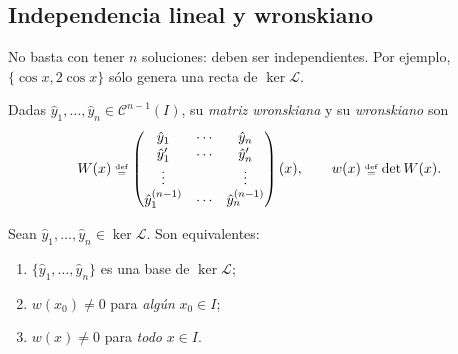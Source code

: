 \documentclass[11pt,twoside]{article}
\newcommand\Lop{\mathcal L}
\newcommand\yh{\hat y}
\newcommand\Cl{\mathcal C}
\newcommand\mat[1]{\begin{pmatrix}#1\end{pmatrix}}
\begin{document}
\subsection{Independencia lineal y wronskiano}

No basta con tener $n$ soluciones: deben ser independientes. Por ejemplo, $\{\cos x,2\cos x\}$ sólo genera una recta de
$\ker\Lop$.

\begin{definicion}\label{def:W}
Dadas $\yh_1,\dots,\yh_n\in\Cl^{n-1}(I)$, su \emph{matriz wronskiana} y su \emph{wronskiano} son
\begin{equation}\label{eq:W}
W(x)\defeq\mat{\yh_1&\cdots&\yh_n\\ \yh_1'&\cdots&\yh_n'\\ \vdots&&\vdots\\ \yh_1^{(n-1)}&\cdots&\yh_n^{(n-1)}}(x),
\qquad w(x)\defeq\det W(x).
\end{equation}
\end{definicion}

\begin{proposicion}\label{prop:wronski}
Sean $\yh_1,\dots,\yh_n\in\ker\Lop$. Son equivalentes:
\begin{enumerate}[label=(\alph*)]
\item $\{\yh_1,\dots,\yh_n\}$ es una base de $\ker\Lop$;
\item $w(x_0)\neq0$ para \emph{algún} $x_0\in I$;
\item $w(x)\neq0$ para \emph{todo} $x\in I$.
\end{enumerate}
\end{proposicion}
\end{document}
